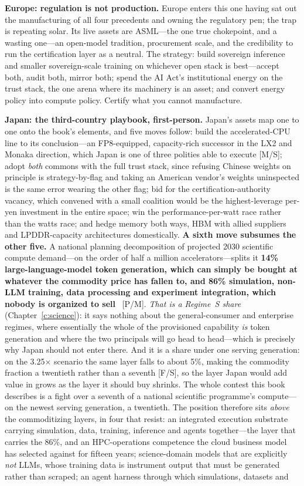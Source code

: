 \textbf{Europe: regulation is not production.} Europe enters this one having sat out the manufacturing of all four precedents and owning the regulatory pen; the trap is repeating solar. Its live assets are ASML---the one true chokepoint, and a wasting one---an open-model tradition, procurement scale, and the credibility to run the certification layer as a neutral. The strategy: build sovereign inference and smaller sovereign-scale training on whichever open stack is best---accept both, audit both, mirror both; spend the AI Act's institutional energy on the trust stack, the one arena where its machinery is an asset; and convert energy policy into compute policy. Certify what you cannot manufacture.

\textbf{Japan: the third-country playbook, first-person.} Japan's assets map one to one onto the book's elements, and five moves follow: build the accelerated-CPU line to its conclusion---an FP8-equipped, capacity-rich successor in the LX2 and Monaka direction, which Japan is one of three polities able to execute [M/S]; adopt \emph{both} commons with the full trust stack, since refusing Chinese weights on principle is strategy-by-flag and taking an American vendor's weights uninspected is the same error wearing the other flag; bid for the certification-authority vacancy, which convened with a small coalition would be the highest-leverage per-yen investment in the entire space; win the performance-per-watt race rather than the watts race; and hedge memory both ways, HBM with allied suppliers and LPDDR-capacity architectures domestically. \textbf{A sixth move subsumes the other five.} A national planning decomposition of projected 2030 scientific compute demand---on the order of half a million accelerators---splits it \textbf{14\% large-language-model token generation, which can simply be bought at whatever the commodity price has fallen to, and 86\% simulation, non-LLM training, data processing and experiment integration, which nobody is organized to sell}~\cite{ai4si-stack} [P/M]. \emph{That is a Regime~S share} (Chapter~\ref{c:science}): it says nothing about the general-consumer and enterprise regimes, where essentially the whole of the provisioned capability \emph{is} token generation and where the two principals will go head to head---which is precisely why Japan should not enter there. And it is a share under one serving generation: on the 3.25$\times$ scenario the same layer falls to about 5\%, making the commodity fraction a twentieth rather than a seventh [F/S], so the layer Japan would add value in grows as the layer it should buy shrinks. The whole contest this book describes is a fight over a seventh of a national scientific programme's compute---on the newest serving generation, a twentieth. The position therefore sits \emph{above} the commoditizing layers, in four that resist: an integrated execution substrate carrying simulation, data, training, inference and agents together---the layer that carries the 86\%, and an HPC-operations competence the cloud business model has selected against for fifteen years; science-domain models that are explicitly \emph{not} LLMs, whose training data is instrument output that must be generated rather than scraped; an agent harness through which simulations, datasets and 